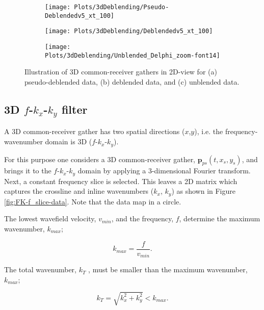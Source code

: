 \documentclass{madrid15WS}
\begin{document}
\begin{figure}[h!]
	\centering
	\begin{subfigure}[t]{0.8\textwidth}
	\texttt{[image: Plots/3dDeblending/Pseudo-Deblendedv5\_xt\_100]}
	\caption{}
	\label{fig:3D-CRG-Pps}
	\end{subfigure}
	
	\centering
	\begin{subfigure}[t]{0.8\textwidth}
	\texttt{[image: Plots/3dDeblending/Deblendedv5\_xt\_100]}
	\caption{}
	\label{fig:3D-CRG-Pdebl}
	\end{subfigure}
	
	\centering
	\begin{subfigure}[t]{0.8\textwidth}
	\texttt{[image: Plots/3dDeblending/Unblended\_Delphi\_zoom-font14]}
	\caption{}
	\label{fig:3D-CRG-Punbl}
	\end{subfigure}
	
	\caption{Illustration of 3D common-receiver gathers in 2D-view for (a) pseudo-deblended data, (b) deblended data, and (c) unblended data.}
	\label{fig:3D-CRG-2D-view}
\end{figure}

\subsection{3D $f$-$k_x$-$k_y$ filter}

A 3D common-receiver gather has two spatial directions ($x$,$y$), i.e. the frequency-wavenumber domain is 3D ($f$-$k_x$-$k_y$).

For this purpose one considers a 3D common-receiver gather, $\mathbf{p}_{ps}(t, x_s, y_s)$, and brings it to the $f$-$k_x$-$k_y$ domain by applying a 3-dimensional Fourier transform. Next, a constant frequency slice is selected. This leaves a 2D matrix which captures the crossline and inline wavenumbers ($k_x$, $k_y$) as shown in Figure \ref{fig:FK-f_slice-data}. Note that the data map in a circle.

The lowest wavefield velocity, $v_{min}$, and the frequency, $f$, determine the maximum wavenumber, $k_{max}$;

\begin{equation}
	k_{max} = \frac{f}{v_{min}}.
	\label{eq:kmax}
\end{equation}

The total wavenumber, $k_T$ , must be smaller than the maximum wavenumber, $k_{max}$; 

\begin{equation}
	k_{T} = \sqrt{k_x^2 + k_y^2} < k_{max}.
	\label{eq:kT}
\end{equation}
\end{document}
